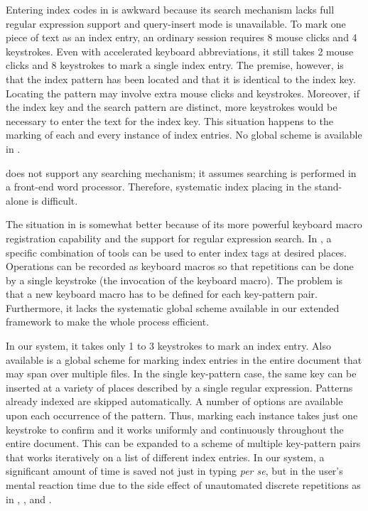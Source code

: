 Entering index codes in {\WD} is awkward because
its search mechanism lacks full regular expression support
and query-insert mode is unavailable.
To mark one piece of text as an index entry, an ordinary session
requires 8 mouse clicks and 4 keystrokes.  Even with accelerated keyboard
abbreviations, it still takes 2 mouse clicks and 8 keystrokes to mark a single
index entry.  The premise, however, is that the index pattern has been
located and that it is identical to the index key.
Locating the pattern may involve extra mouse clicks and keystrokes.
Moreover, if the index key and the search pattern are distinct, more
keystrokes would be necessary to enter the text for the index key.
This situation happens to the marking of each and every instance
of index entries.  No global scheme is available in {\WD}.

{\VP} does not support any searching mechanism; it assumes
searching is performed in a front-end word processor.
Therefore, systematic index placing in the stand-alone {\VP} is difficult.

The situation in {\FM} is somewhat better because of its more powerful
keyboard macro registration capability and the support for regular
expression search.  In {\FM}, a specific combination
of tools can be used to enter index tags at desired places.
Operations can be recorded as keyboard macros so that repetitions
can be done by a single keystroke (the invocation of the keyboard macro).
The problem is that a new keyboard macro has to be defined for each
key-pattern pair.  Furthermore, it
lacks the systematic global scheme available in our extended
framework to make the whole process efficient.

In our system, it takes only 1 to 3 keystrokes to mark an index entry.
Also available is a global scheme for marking index entries in the entire
document that may span over multiple files.  In the single key-pattern
case, the same key can be inserted at a variety of places
described by a single regular expression.  Patterns already indexed
are skipped automatically.  A number of options are
available upon each occurrence of the pattern.  Thus, marking each instance
takes just one keystroke to confirm and it works uniformly and continuously
throughout the entire document.  This can be expanded to a scheme of
multiple key-pattern pairs that works iteratively on a list of 
different index entries.
In our system,
a significant amount of time is saved not just in typing {\it per se\/}, but
in the user's mental reaction time due to the side effect of
unautomated discrete repetitions as in {\FM}, {\WD}, and {\VP}.

